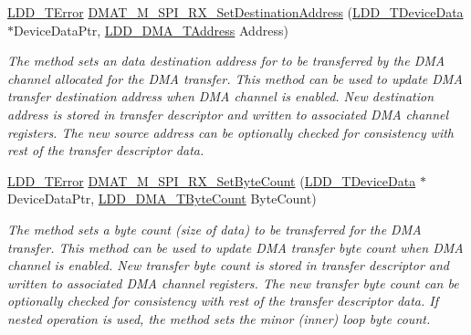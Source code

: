 \begin{DoxyCompactItemize}
\hyperlink{group___p_e___types__module_ga24c2b045fd04e79e85f261ce4df35588}{L\-D\-D\-\_\-\-T\-Error} \hyperlink{group___d_m_a_t___m___s_p_i___r_x__module_ga902c844d7c70f4c7d494f83e65f58cd2}{D\-M\-A\-T\-\_\-\-M\-\_\-\-S\-P\-I\-\_\-\-R\-X\-\_\-\-Set\-Destination\-Address} (\hyperlink{group___p_e___types__module_gac5cf1362f1f0e3a2ce71b1bf2276d091}{L\-D\-D\-\_\-\-T\-Device\-Data} $\ast$Device\-Data\-Ptr, \hyperlink{group___p_e___types__module_gab8287f62db7ff96992355760b652cd07}{L\-D\-D\-\_\-\-D\-M\-A\-\_\-\-T\-Address} Address)
\begin{DoxyCompactList}\small\item\em The method sets an data destination address for to be transferred by the D\-M\-A channel allocated for the D\-M\-A transfer. This method can be used to update D\-M\-A transfer destination address when D\-M\-A channel is enabled. New destination address is stored in transfer descriptor and written to associated D\-M\-A channel registers. The new source address can be optionally checked for consistency with rest of the transfer descriptor data. \end{DoxyCompactList}\item 
\hyperlink{group___p_e___types__module_ga24c2b045fd04e79e85f261ce4df35588}{L\-D\-D\-\_\-\-T\-Error} \hyperlink{group___d_m_a_t___m___s_p_i___r_x__module_ga060c809d41d04bdf1d7b974bf4b61730}{D\-M\-A\-T\-\_\-\-M\-\_\-\-S\-P\-I\-\_\-\-R\-X\-\_\-\-Set\-Byte\-Count} (\hyperlink{group___p_e___types__module_gac5cf1362f1f0e3a2ce71b1bf2276d091}{L\-D\-D\-\_\-\-T\-Device\-Data} $\ast$Device\-Data\-Ptr, \hyperlink{group___p_e___types__module_gac001a681eb67942fa78ac9b62ba3b0d6}{L\-D\-D\-\_\-\-D\-M\-A\-\_\-\-T\-Byte\-Count} Byte\-Count)
\begin{DoxyCompactList}\small\item\em The method sets a byte count (size of data) to be transferred for the D\-M\-A transfer. This method can be used to update D\-M\-A transfer byte count when D\-M\-A channel is enabled. New transfer byte count is stored in transfer descriptor and written to associated D\-M\-A channel registers. The new transfer byte count can be optionally checked for consistency with rest of the transfer descriptor data. If nested operation is used, the method sets the minor (inner) loop byte count. \end{DoxyCompactList}\end{DoxyCompactItemize}
